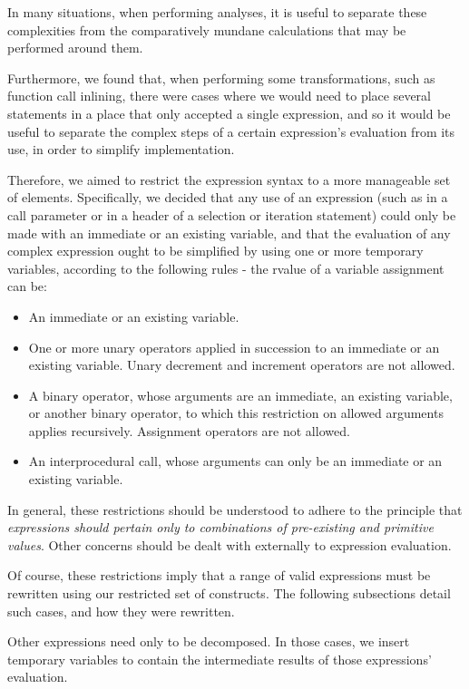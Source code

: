 In many situations, when performing analyses, it is useful to separate these complexities from the comparatively mundane calculations that may be performed around them.

Furthermore, we found that, when performing some transformations, such as function call inlining, there were cases where we would need to place several statements in a place that only accepted a single expression, and so it would be useful to separate the complex steps of a certain expression's evaluation from its use, in order to simplify implementation.

Therefore, we aimed to restrict the expression syntax to a more manageable set of elements. Specifically, we decided that any use of an expression (such as in a call parameter or in a header of a selection or iteration statement) could only be made with an immediate or an existing variable, and that the evaluation of any complex expression ought to be simplified by using one or more temporary variables, according to the following rules - the rvalue of a variable assignment can be:

\begin{itemize}
    \item An immediate or an existing variable.
    \item One or more unary operators applied in succession to an immediate or an existing variable. Unary decrement and increment operators are not allowed.
    \item A binary operator, whose arguments are an immediate, an existing variable, or another binary operator, to which this restriction on allowed arguments applies recursively. Assignment operators are not allowed.
    \item An interprocedural call, whose arguments can only be an immediate or an existing variable.
\end{itemize}

In general, these restrictions should be understood to adhere to the principle that \textit{expressions should pertain only to combinations of pre-existing and primitive values}. Other concerns should be dealt with externally to expression evaluation.

Of course, these restrictions imply that a range of valid expressions must be rewritten using our restricted set of constructs. The following subsections detail such cases, and how they were rewritten.

Other expressions need only to be decomposed. In those cases, we insert temporary variables to contain the intermediate results of those expressions' evaluation.

